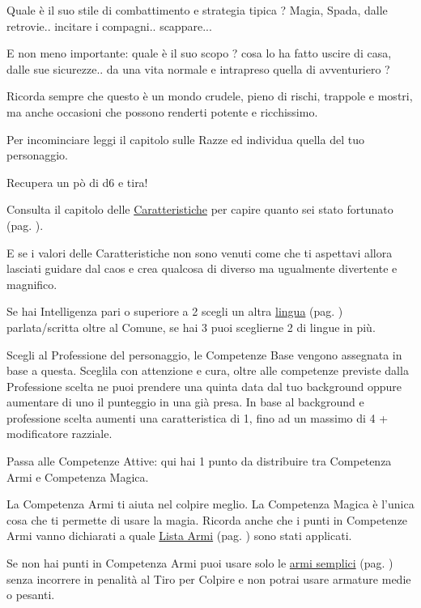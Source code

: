 \begin{multicols}{2}
Quale è il suo stile di combattimento e strategia tipica ? Magia, Spada, dalle retrovie.. incitare i compagni.. scappare...

E non meno importante: quale è il suo scopo ? cosa lo ha fatto uscire di casa, dalle sue sicurezze.. da una vita normale e intrapreso quella di avventuriero ?

Ricorda sempre che questo è un mondo crudele, pieno di rischi, trappole e mostri, ma anche occasioni che possono renderti potente e ricchissimo.

Per incominciare leggi il capitolo sulle Razze ed individua quella del tuo personaggio.

Recupera un pò di d6 e tira!

Consulta il capitolo delle \hyperlink{assegnazione.punteggi.caratteristica}{Caratteristiche} per capire quanto sei stato fortunato (pag. \pageref{assegnazionepunteggicaratteristica}).

E se i valori delle Caratteristiche non sono venuti come che ti aspettavi allora lasciati guidare dal caos e crea qualcosa di diverso ma ugualmente divertente e magnifico.

Se hai Intelligenza pari o superiore a 2 scegli un altra \hyperlink{linguaggi}{lingua} (pag. \pageref{linguaggi}) parlata/scritta oltre al Comune, se hai 3 puoi sceglierne 2 di lingue in più.

Scegli al Professione del personaggio, le Competenze Base vengono assegnata in base a questa. Sceglila con attenzione e cura, oltre alle competenze previste dalla Professione scelta ne puoi prendere una quinta data dal tuo background oppure aumentare di uno il punteggio in una già presa.
In base al background e professione scelta aumenti una caratteristica di 1, fino ad un massimo di 4 + modificatore razziale.

Passa alle Competenze Attive: qui hai 1 punto  da distribuire tra Competenza Armi e Competenza Magica.

La Competenza Armi ti aiuta nel colpire meglio. La Competenza Magica è l'unica cosa che ti permette di usare la magia. Ricorda anche che i punti in Competenze Armi vanno dichiarati a quale \hyperlink{lista.armi}{Lista Armi} (pag. \pageref{lista.armi}) sono stati applicati.

Se non hai punti in Competenza Armi puoi usare solo le \hyperlink{armi.semplici}{armi semplici} (pag. \pageref{listaarmisemplice}) senza incorrere in penalità al Tiro per Colpire e non potrai usare armature medie o pesanti.



\end{multicols}
